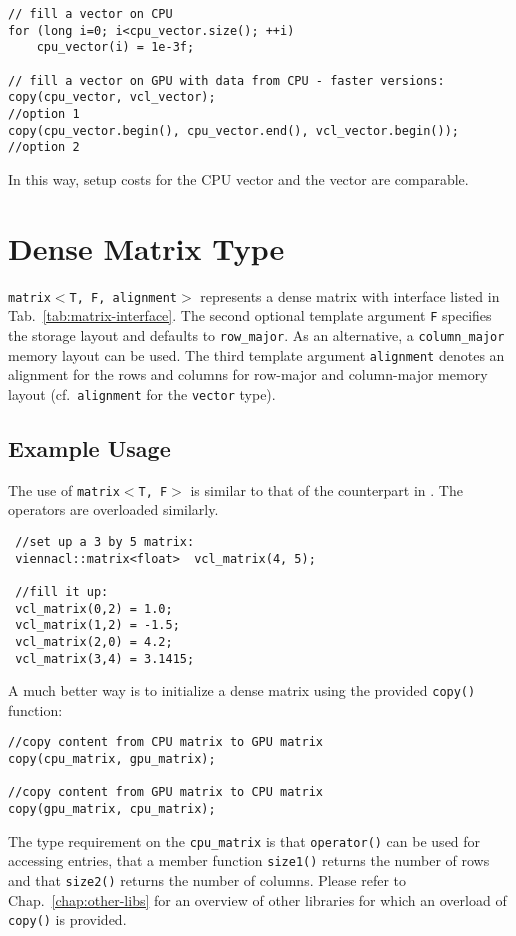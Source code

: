   \begin{lstlisting}
// fill a vector on CPU
for (long i=0; i<cpu_vector.size(); ++i)
    cpu_vector(i) = 1e-3f;

// fill a vector on GPU with data from CPU - faster versions:
copy(cpu_vector, vcl_vector);                                   //option 1
copy(cpu_vector.begin(), cpu_vector.end(), vcl_vector.begin()); //option 2
\end{lstlisting} 
In this way, setup costs for the CPU vector and the {\ViennaCL} vector are comparable.

\section{Dense Matrix Type}
\texttt{matrix$<$T, F, alignment$>$} represents a dense matrix with interface listed in
Tab.~\ref{tab:matrix-interface}. The second optional template argument \texttt{F}
specifies the storage layout and defaults to \texttt{row\_major}. As an alternative, a \lstinline|column_major| memory layout can be used.
The third template argument \texttt{alignment} denotes an alignment for the rows and columns for row-major and column-major memory layout (cf.~\texttt{alignment} for the \texttt{vector} type).

\subsection{Example Usage}
The use of \texttt{matrix$<$T, F$>$} is similar to that of the counterpart in {\ublas}. The operators are overloaded similarly.

\begin{lstlisting}
 //set up a 3 by 5 matrix:
 viennacl::matrix<float>  vcl_matrix(4, 5);

 //fill it up:
 vcl_matrix(0,2) = 1.0; 
 vcl_matrix(1,2) = -1.5; 
 vcl_matrix(2,0) = 4.2; 
 vcl_matrix(3,4) = 3.1415; 
\end{lstlisting} 


A much better way is to initialize a dense matrix using the provided \texttt{copy()} function:
\begin{lstlisting}
//copy content from CPU matrix to GPU matrix
copy(cpu_matrix, gpu_matrix);

//copy content from GPU matrix to CPU matrix
copy(gpu_matrix, cpu_matrix);
\end{lstlisting} 
The type requirement on the \texttt{cpu\_matrix} is that \texttt{operator()} can be used for accessing entries, that a member function \texttt{size1()} returns the number of rows and that \texttt{size2()} returns the number of columns.
Please refer to Chap.~\ref{chap:other-libs} for an overview of other libraries for which an overload of \texttt{copy()} is provided.

